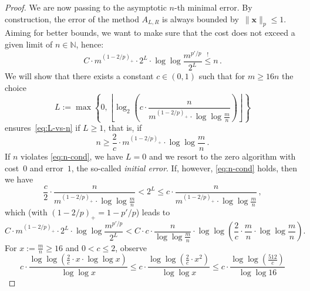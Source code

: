 \documentclass[12pt]{article}
\theoremstyle{plain}
\theoremstyle{definition}
\renewcommand{\vec}{\boldsymbol}
\newcommand{\N}{{\mathbb N}}
\begin{document}
\begin{proof}
    We are now passing to the asymptotic $n$-th minimal error.
    By construction, the error of the method $A_{L,R}$ is always bounded by~$\|\vec{x}\|_p \leq 1$.
    Aiming for better bounds,
    we want to make sure that the cost does not exceed a given limit of $n \in \N$, hence:
    \begin{equation} \label{eq:L-vs-n}
        C \cdot m^{(1-2/p)_+} \cdot 2^L \cdot \log \log \frac{m^{p'\!/p}}{2^L}
            \stackrel{!}{\leq} n\,.
    \end{equation}
    We will show that there exists a constant $c \in (0,1)$ such that for $m \geq 16n$ the choice
    \begin{equation*}
        L := \max\left\{0,
                \left\lfloor \log_2\left(c \cdot \frac{n}{m^{(1-2/p)_+} \cdot \log \log \frac{m}{n}}\right) \right\rfloor
                \right\}
    \end{equation*}
    ensures~\eqref{eq:L-vs-n} if $L \geq 1$, that is, if
    \begin{equation} \label{eq:n-cond}
        n \geq \frac{2}{c} \cdot m^{(1-2/p)_+} \cdot \log \log \frac{m}{n} \,.
    \end{equation}
    If $n$ violates \eqref{eq:n-cond}, we have $L=0$ and
    we resort to the zero algorithm with cost~$0$ and error~$1$,
    the so-called \emph{initial error}.
    If, however,  \eqref{eq:n-cond} holds, then we have
    \begin{equation} \label{eq:2^L-order}
        \frac{c}{2} \cdot \frac{n}{m^{(1-2/p)_+} \cdot \log \log \frac{m}{n}}
            < 2^L 
            \leq c \cdot \frac{n}{m^{(1-2/p)_+} \cdot \log \log \frac{m}{n}} \,,
    \end{equation}
    which (with $(1-2/p)_+ = 1 - p'\!/p$) leads to
    \begin{equation} \label{eq:Cc-bound}
        C \cdot m^{(1-2/p)_+} \cdot 2^L \cdot \log \log \frac{m^{p'\!/p}}{2^L}
            < C \cdot c \cdot \frac{n}{\log \log \frac{m}{n}}
                    \cdot \log \log \left(\frac{2}{c} \cdot \frac{m}{n} 
                                            \cdot \log \log \frac{m}{n} 
                                    \right) .
    \end{equation}
    For $x := \frac{m}{n} \geq 16$ and $0 < c \leq 2$, observe
    \begin{equation*}
        c \cdot \frac{\log \log \left(\frac{2}{c}\cdot x \cdot \log \log x\right)}{\log \log x}
            \leq c \cdot \frac{\log \log \left(\frac{2}{c} \cdot x^2\right)}{\log \log x}
            \leq c \cdot \frac{\log \log \left(\frac{512}{c}\right)}{\log \log 16}

\end{equation*}
\end{proof}
\end{document}
